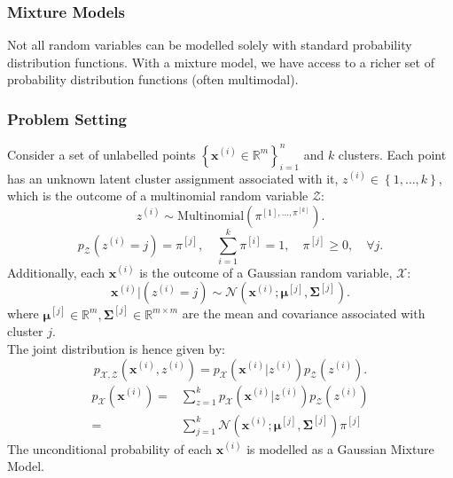 \subsubsection{Mixture Models}
Not all random variables can be modelled solely with standard probability
distribution functions.  With a mixture model, we have access to a richer set
of probability distribution functions (often multimodal).
\subsubsection{Problem Setting}
Consider a set of unlabelled points ${\left\{ \mathbf{x}^{(i)}\in \mathbb{R}^{m}
\right\}}^{n}_{i=1}$ and $k$ clusters. Each point has an unknown latent cluster
assignment associated with it, $z^{(i)}\in \left\{ 1,\ldots,k \right\}$, which
is the outcome of a multinomial random variable $\mathcal{Z}$:
\[z^{(i)}\sim\text{Multinomial}\left( \pi^{[1],\ldots,\pi^{[k]}} \right).\] 
\[p_{\mathcal{Z}}\left( z^{(i)}=j \right) =\pi^{[j]},\quad \sum_{i=1}^{k}
\pi^{[i]}=1,\quad\pi^{[j]}\ge 0,\quad\forall j.\] 
Additionally, each $\mathbf{x}^{(i)}$ is the outcome of a Gaussian random
variable, $\mathcal{X}$:
\[\mathbf{x}^{(i)}|\left( z^{(i)}=j \right) \sim \mathcal{N}\left(
\mathbf{x}^{(i)};\mathbf{\mu}^{[j]},\mathbf{\Sigma}^{[j]} \right).\]
where $\mathbf{\mu}^{[j]}\in \mathbb{R}^{m},\mathbf{\Sigma}^{[j]}\in
\mathbb{R}^{m\times m}$ are the mean and covariance associated with cluster
$j$.\\
The joint distribution is hence given by:
\[p_{\mathcal{X}, \mathcal{Z}}\left( \mathbf{x}^{(i)},z^{(i)} \right)
=p_{\mathcal{X}}\left( \mathbf{x}^{(i)}|z^{(i)} \right) p_{\mathcal{Z}}\left(
z^{(i)} \right).\] 
\begin{align*}
  p_{\mathcal{X}}\left( \mathbf{x}^{(i)} \right) =&
  \sum_{z=1}^{k} p_{\mathcal{X}}\left( \mathbf{x}^{(i)}|z^{(i)} \right)
  p_{\mathcal{Z}}\left( z^{(i)} \right)\\
  =&\sum_{j=1}^{k} \mathcal{N}\left(\mathbf{x}^{(i)};\mathbf{\mu}^{[j]},\mathbf{\Sigma}^{[j]}\right)\pi^{[j]}
\end{align*}
The unconditional probability of each $\mathbf{x}^{(i)}$ is modelled as a
Gaussian Mixture Model.
